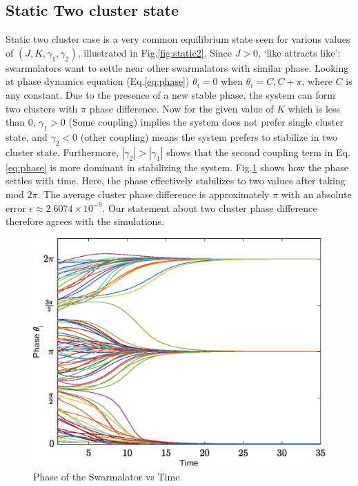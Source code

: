 \documentclass[twocolumn,10pt]{asme2ej}
\begin{document}
{    \subsection{Static Two cluster state}
    {
        \noindent
        Static two cluster case is a very common equilibrium state seen for various values of \((J,K,\gamma_1,\gamma_2)\), illustrated in  Fig.\ref{fig:static2}. Since \(J > 0\), `like attracts like': swarmalators want to settle near other swarmalators with similar phase. Looking at phase dynamics equation (Eq.\ref{eq:phase}) \(\dot{\theta}_{i} = 0\) when \(\theta_i = C, C + \pi \), where \(C\) is any constant. Due to the presence of a new stable phase, the system can form two clusters with \(\pi\) phase difference. Now for the given value of \(K\) which is less than 0, \(\gamma_1 > 0\) (Some coupling) implies the system does not prefer single cluster state, and \(\gamma_2 < 0\) (other coupling) means the system prefers to stabilize in two cluster state. Furthermore, \(|\gamma_2| > |\gamma_1|\) shows that the second coupling term in Eq.\ref*{eq:phase} is more dominant in stabilizing the system. Fig.\ref{fig:phasevsTime} shows how the phase settles with time. Here, the phase effectively stabilizes to two values after taking mod \(2\pi\). The average cluster phase difference is approximately \(\pi\) with an absolute error \(\epsilon \approx 2.6074 \times 10^{-9}\). Our statement about two cluster phase difference therefore agrees with the simulations. 

        \begin{figure}
            \includegraphics[width = \linewidth]{phasevstimeN_100.eps}
            \caption{Phase of the Swarmalator vs Time. }
            \label{fig:phasevsTime}
        \end{figure}
    }
    
}
\end{document}
